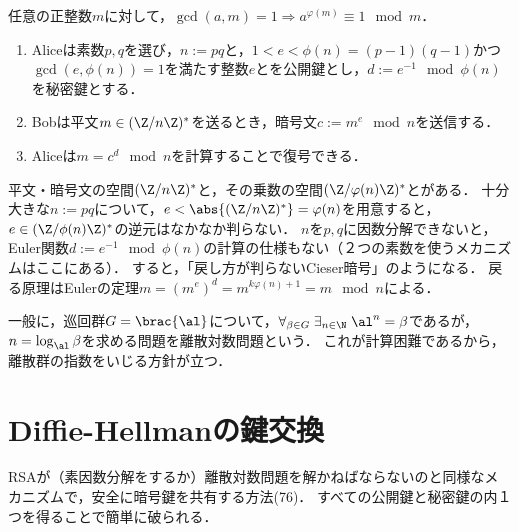 \documentclass[uplatex,dvipdfmx]{jsreport}
\begin{document}
\begin{theorem}[Euler]
    任意の正整数$m$に対して，$\gcd(a,m)=1\Rightarrow a^{\varphi(m)}\equiv1\mod m$．
\end{theorem}

\begin{definition}\mbox{}
    \begin{enumerate}
        \item Aliceは素数$p,q$を選び，$n:=pq$と，$1<e<\phi(n)=(p-1)(q-1)$かつ$\gcd(e,\phi(n))=1$を満たす整数$e$とを公開鍵とし，$d:=e^{-1}\mod\phi(n)$を秘密鍵とする．
        \item Bobは平文$m\in(\Z/n\Z)^*$を送るとき，暗号文$c:=m^e\mod n$を送信する．
        \item Aliceは$m=c^d\mod n$を計算することで復号できる．
    \end{enumerate}
\end{definition}
\begin{remarks}
    平文・暗号文の空間$(\Z/n\Z)^*$と，その乗数の空間$(\Z/\varphi(n)\Z)^*$とがある．
    十分大きな$n:=pq$について，$e<\abs{(\Z/n\Z)^*}=\varphi(n)$を用意すると，
    $e\in(\Z/\phi(n)\Z)^*$の逆元はなかなか判らない．
    $n$を$p,q$に因数分解できないと，Euler関数$d:=e^{-1}\mod\phi(n)$の計算の仕様もない（２つの素数を使うメカニズムはここにある）．
    すると，「戻し方が判らないCieser暗号」のようになる．
    戻る原理はEulerの定理$m=(m^e)^{d}=m^{k\varphi(n)+1}=m\mod n$による．
\end{remarks}

\begin{example}
    一般に，巡回群$G=\brac{\al}$について，$\forall_{\beta\in G}\;\exists_{n\in\N}\;\al^n=\beta$であるが，$n=\log_\al\beta$を求める問題を離散対数問題という．
    これが計算困難であるから，離散群の指数をいじる方針が立つ．
\end{example}

\section{Diffie-Hellmanの鍵交換}

\begin{tcolorbox}[colframe=ForestGreen, colback=ForestGreen!10!white,breakable,colbacktitle=ForestGreen!40!white,coltitle=black,fonttitle=\bfseries\sffamily,
title=]
    RSAが（素因数分解をするか）離散対数問題を解かねばならないのと同様なメカニズムで，安全に暗号鍵を共有する方法(76)．
    すべての公開鍵と秘密鍵の内１つを得ることで簡単に破られる．
\end{tcolorbox}
\end{document}
